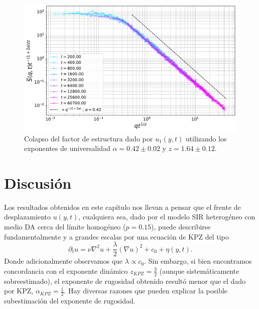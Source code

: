 \begin{figure}[t]
    \centering
    \includegraphics[width=\imsizeL]{Sq_colapse.pdf}
    \caption{Colapso del factor de estructura dado por $u_1(y,t)$ utilizando los exponentes de universalidad $\alpha = 0.42\pm0.02$ y $z = 1.64 \pm 0.12$.}
    \label{fig:Sq_colapse}
\end{figure}

\section*{Discusión}

Los resultados obtenidos en este capítulo nos llevan a pensar que el frente de desplazamiento $u(y,t)$, cualquiera sea, dado por el modelo SIR heterogéneo con medio DA cerca del límite homogéneo ($p=0.15$), puede describirse fundamentalmente y a grandes escalas por una ecuación de KPZ del tipo
\begin{equation}
    \partial_t u = \nu \nabla^2u + \frac{\lambda}{2} \left(\nabla u\right)^2 + c_0 + \eta(y,t).
    \label{KPZ_2}
\end{equation}
Donde adicionalmente observamos que $\lambda\propto c_0$. Sin embargo, si bien encontramos concordancia con el exponente dinámico $z_{KPZ} = \frac{3}{2}$ (aunque sistemáticamente sobreestimado), el exponente de rugosidad obtenido resultó menor que el dado por KPZ, $\alpha_{KPZ} = \frac{1}{2}$. Hay diversas razones que pueden explicar la posible subestimación del exponente de rugosidad.

